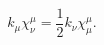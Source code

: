 \begin{equation}
k_\mu \chi^{\mu}_\nu = \frac{1}{2}k_\nu \chi^{\mu}_\mu .
\label{533}
\end{equation}

